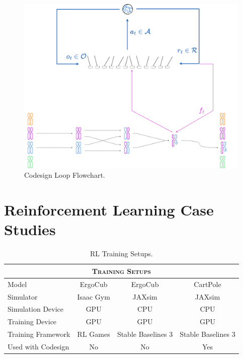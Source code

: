 \begin{figure}
    \centering
    \caption{Codesign Loop Flowchart.}
    \label{fig:codesignloop}
    \includegraphics[width=.9\textwidth]{Images/codesign_loop.png}
\end{figure}

\section{Reinforcement Learning Case Studies}
\label{sec:codesign_results}

\begin{table}
    \centering
    \begin{tabular}{l c c c}
        \toprule
        \multicolumn{4}{c}{\textsc{Training Setups}}                             \\
        \midrule
        Model              & ErgoCub   & ErgoCub            & CartPole           \\
        Simulator          & Isaac Gym & JAXsim             & JAXsim             \\
        Simulation Device  & GPU       & CPU                & CPU                \\
        Training Device    & GPU       & GPU                & GPU                \\
        Training Framework & RL Games  & Stable Baselines 3 & Stable Baselines 3 \\
        Used with Codesign & No        & No                 & Yes                \\
        \bottomrule
    \end{tabular}
    \caption{RL Training Setups.}
\end{table}

